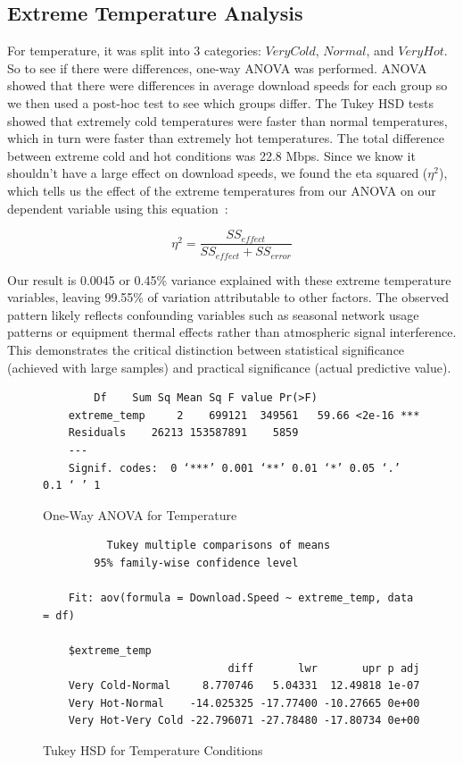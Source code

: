 \documentclass[11pt]{report}
\begin{document}
\clearpage

\subsection{Extreme Temperature Analysis}

For temperature, it was split into 3 categories: $Very Cold$, $Normal$, and $Very Hot$. So to see if there were differences, one-way ANOVA was performed. ANOVA showed that there were differences in average download speeds for each group so we then used a post-hoc test to see which groups differ. The Tukey HSD tests showed that extremely cold temperatures were faster than normal temperatures, which in turn were faster than extremely hot temperatures. The total difference between extreme cold and hot conditions was 22.8 Mbps.
Since we know it shouldn't have a large effect on download speeds, we found the eta squared ($\eta^2$), which tells us the effect of the extreme temperatures from our ANOVA on our dependent variable using this equation~\cite{nationaluniversity2024eta}:

\begin{equation}
    \eta^2 = \frac{SS_{effect}}{SS_{effect} + SS_{error}}
\end{equation}

Our result is 0.0045 or 0.45\% variance explained with these extreme temperature variables, leaving 99.55\% of variation attributable to other factors. The observed pattern likely reflects confounding variables such as seasonal network usage patterns or equipment thermal effects rather than atmospheric signal interference. This demonstrates the critical distinction between statistical significance (achieved with large samples) and practical significance (actual predictive value).

\begin{figure}[ht!]
    \centering
    \begin{verbatim}
        Df    Sum Sq Mean Sq F value Pr(>F)    
    extreme_temp     2    699121  349561   59.66 <2e-16 ***
    Residuals    26213 153587891    5859                   
    ---
    Signif. codes:  0 ‘***’ 0.001 ‘**’ 0.01 ‘*’ 0.05 ‘.’ 0.1 ‘ ’ 1
    \end{verbatim}
    \caption{One-Way ANOVA for Temperature}
    \label{fig:anova}
\end{figure}

\begin{figure}[ht!]
    \centering
    \begin{verbatim}
          Tukey multiple comparisons of means
        95% family-wise confidence level
    
    Fit: aov(formula = Download.Speed ~ extreme_temp, data = df)
    
    $extreme_temp
                             diff       lwr       upr p adj
    Very Cold-Normal     8.770746   5.04331  12.49818 1e-07
    Very Hot-Normal    -14.025325 -17.77400 -10.27665 0e+00
    Very Hot-Very Cold -22.796071 -27.78480 -17.80734 0e+00
    \end{verbatim}
    \caption{Tukey HSD for Temperature Conditions}
    \label{fig:tukey}
\end{figure}
\end{document}
